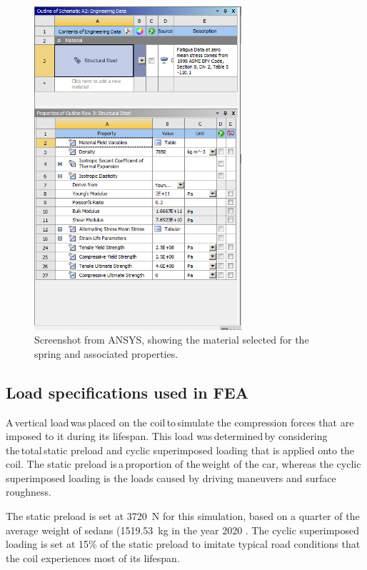 \documentclass[11pt]{article}
\begin{document}
\begin{figure}[H]
    \centering
    \includegraphics[height = 12cm]{./img/materials.png}
    \caption{Screenshot from ANSYS, showing the material selected for the spring and associated properties.}
    \label{fig:ansys1}
\end{figure}
\subsection{Load specifications used in FEA}
A vertical load was placed on the coil to simulate the compression forces that are imposed to it during its lifespan. This load was determined by considering the total static preload and cyclic superimposed loading that is applied onto the coil. The static preload is a proportion of the weight of the car, whereas the cyclic superimposed loading is the loads caused by driving maneuvers and surface roughness.   

The static preload is set at \SI{3720}{\newton} for this simulation, based on a quarter of the average weight of sedans (\SI{1519.53}{\kilo\gram} in the year 2020 \cite{b1}. The cyclic superimposed loading is set at 15\% of the static preload to imitate typical road conditions that the coil experiences most of its lifespan.
\end{document}
